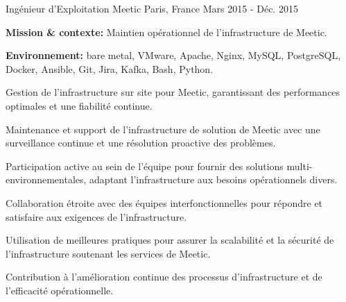 \begin{cventries}
\cventry
{Ingénieur d'Exploitation} %
{Meetic} %
{Paris, France} %
{Mars 2015 - Déc. 2015} %
{
  \begin{cvitems} %
    \item {\textbf{Mission \& contexte:} Maintien opérationnel de l'infrastructure de Meetic.}
    \item {\textbf{Environnement:} bare metal, VMware, Apache, Nginx, MySQL, PostgreSQL, Docker, Ansible, Git, Jira, Kafka, Bash, Python.}
    \item {Gestion de l'infrastructure sur site pour Meetic, garantissant des performances optimales et une fiabilité continue.}
    \item {Maintenance et support de l'infrastructure de solution de Meetic avec une surveillance continue et une résolution proactive des problèmes.}
    \item {Participation active au sein de l'équipe pour fournir des solutions multi-environnementales, adaptant l'infrastructure aux besoins opérationnels divers.}
    \item {Collaboration étroite avec des équipes interfonctionnelles pour répondre et satisfaire aux exigences de l'infrastructure.}
    \item {Utilisation de meilleures pratiques pour assurer la scalabilité et la sécurité de l'infrastructure soutenant les services de Meetic.}
    \item {Contribution à l'amélioration continue des processus d'infrastructure et de l'efficacité opérationnelle.}
  \end{cvitems}
}


\end{cventries}

